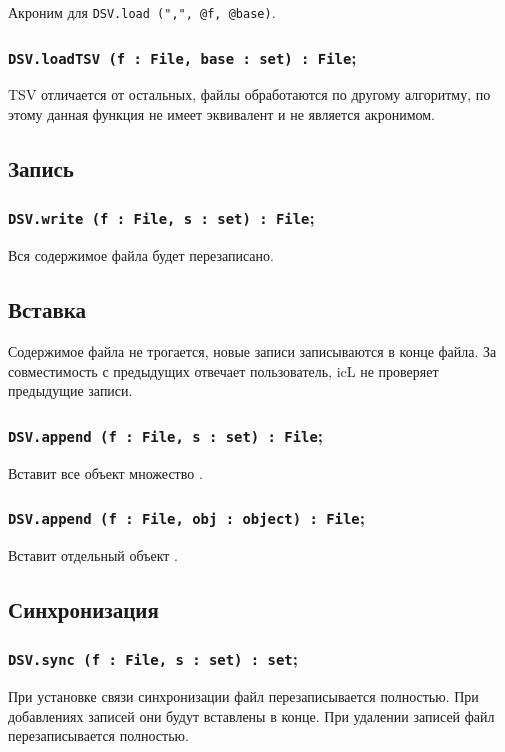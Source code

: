 Акроним для \lstinline|DSV.load (",", @f, @base)|.

\subsubsection{\lstinline|DSV.loadTSV (f : File, base : set) : File|;}

TSV отличается от остальных, файлы обработаются по другому алгоритму, по этому данная функция не имеет эквивалент и не является акронимом.

\subsection{Запись}

\subsubsection{\lstinline|DSV.write (f : File, s : set) : File|;}

Вся содержимое файла будет перезаписано.

\subsection{Вставка}

Содержимое файла не трогается, новые записи записываются в конце файла. За совместимость с предыдущих отвечает пользователь, icL не проверяет предыдущие записи.

\subsubsection{\lstinline|DSV.append (f : File, s : set) : File|;}

Вставит все объект множество .

\subsubsection{\lstinline|DSV.append (f : File, obj : object) : File|;}

Вставит отдельный объект .

\subsection{Синхронизация}

\subsubsection{\lstinline|DSV.sync (f : File, s : set) : set|;}

При установке связи синхронизации файл перезаписывается полностью. При добавлениях записей они будут вставлены в конце. При удалении записей файл перезаписывается полностью.

